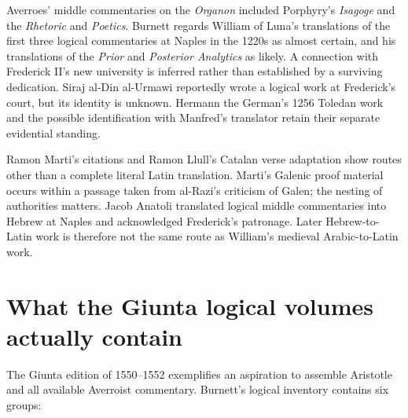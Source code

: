 Averroes' middle commentaries on the \emph{Organon} included
Porphyry's \emph{Isagoge} and the \emph{Rhetoric} and \emph{Poetics}.
Burnett regards William of Luna's translations of the first three
logical commentaries at Naples in the 1220s as almost certain,
and his translations of the \emph{Prior} and \emph{Posterior
Analytics} as likely. A connection with Frederick II's new
university is inferred rather than established by a surviving
dedication. Siraj al-Din al-Urmawi reportedly wrote a logical
work at Frederick's court, but its identity is unknown. Hermann
the German's 1256 Toledan work and the possible identification
with Manfred's translator retain their separate evidential standing.
\cite[pp.~598--599]{Burnett2004ArabicLatinHHL}

Ramon Marti's citations and Ramon Llull's Catalan verse adaptation
show routes other than a complete literal Latin translation.
Marti's Galenic proof material occurs within a passage taken
from al-Razi's criticism of Galen; the nesting of authorities
matters. Jacob Anatoli translated logical middle commentaries
into Hebrew at Naples and acknowledged Frederick's patronage.
Later Hebrew-to-Latin work is therefore not the same route as
William's medieval Arabic-to-Latin work.
\cite[p.~599, notes~6--8]{Burnett2004ArabicLatinHHL}

\section{What the Giunta logical volumes actually contain}
\label{sec:p13-burnett-2004-giunta}

The Giunta edition of 1550--1552 exemplifies an aspiration to
assemble Aristotle and all available Averroist commentary.
Burnett's logical inventory contains six groups:
\cite[pp.~599--600]{Burnett2004ArabicLatinHHL}

